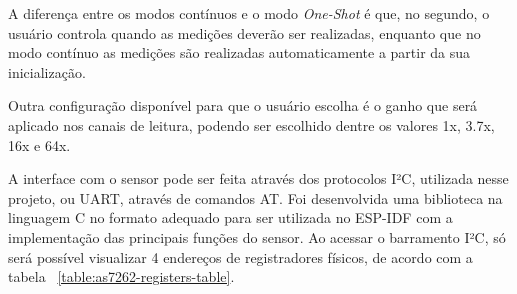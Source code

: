 \documentclass[../monografia.tex]{subfiles}
\begin{document}
A diferença entre os modos contínuos e o modo \textit{One-Shot} é que, no segundo, o usuário controla quando as medições deverão ser realizadas, enquanto que no modo contínuo as medições são realizadas automaticamente a partir da sua inicialização.

Outra configuração disponível para que o usuário escolha é o ganho que será aplicado nos canais de leitura, podendo ser escolhido dentre os valores 1x, 3.7x, 16x e 64x.

A interface com o sensor pode ser feita através dos protocolos I²C, utilizada nesse projeto, ou UART, através de comandos AT. Foi desenvolvida uma biblioteca na linguagem C no formato adequado para ser utilizada no ESP-IDF com a implementação das principais funções do sensor. Ao acessar o barramento I²C, só será possível visualizar 4 endereços de registradores físicos, de acordo com a tabela ~\ref{table:as7262-registers-table}.
\end{document}
